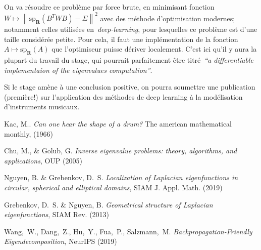 \documentclass[a4paper,11pt]{article}
\begin{document}
On va résoudre ce problème par force brute, en minimisant
fonction~$W\mapsto\left\|\mathrm{sp}_\mathbf{R}\left(B^TWB\right)-\Sigma\right\|^2$
avec des méthode d'optimisation modernes; notamment celles utilisées
en~\emph{deep-learning}, pour lesquelles ce problème est d'une taille
considérée petite.  Pour cela, il faut une implémentation de la
fonction~$A\mapsto\mathrm{sp}_\mathbf R(A)$ que l'optimiseur puisse dériver
localement.  C'est ici qu'il y aura la plupart du travail du stage, qui
pourrait parfaitement être titré~\emph{``a differentiable implementaion of the
eigenvalues computation''}.

Si le stage amène à une conclusion positive, on pourra soumettre une
publication (première!) sur l'application des méthodes de deep learning à la
modélisation d'instruments musicaux.


\vspace{-1.5em}
\renewcommand{\refname}{\normalsize Références}
%
\begin{thebibliography}{99}
\vspace{-1em}
{\scriptsize
{}
	Kac, M..
	{\it Can one hear the shape of a drum?}
	The american mathematical monthly, (1966)

	Chu, M., \& Golub, G.
	{\it Inverse eigenvalue problems: theory, algorithms, and
	applications}, OUP (2005)

	Nguyen, B. \& Grebenkov, D.~S.
	{\it Localization of Laplacian eigenfunctions in circular, spherical
	and elliptical domains}, SIAM J.  Appl. Math. (2019)

	Grebenkov, D.~S.  \& Nguyen, B.
	{\it Geometrical structure of Laplacian eigenfunctions},
	SIAM Rev. (2013)

	Wang,~W., Dang,~Z., Hu,~Y., Fua,~P., Salzmann,~M.
	{\it Backpropagation-Friendly Eigendecomposition},
	NeurIPS (2019)

}
\end{thebibliography}
\end{document}
